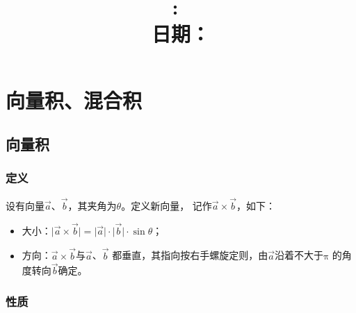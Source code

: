 \documentclass[12pt, a4paper]{article}
\title{
    \vspace{2in}
    \textmd{\textbf{\hmwkClass:\ \hmwkTitle}}\\
    \normalsize\vspace{0.1in}\small{日期： \hmwkDueDate}\\
    \vspace{0.1in}\large{\textit{\myUniversiy}}
    \vspace{3in}
}
\author{\hmwkAuthorName}
\date{}
\numberwithin{equation}{section}
\begin{document}
\maketitle

\pagebreak


\tableofcontents

\pagebreak


\pagebreak

\section{向量积、混合积}

\subsection{向量积}

\subsubsection{定义}

    设有向量\(\overrightarrow{a}\)、\(\overrightarrow{b}\)，其夹角为\(\theta\)。定义新向量，
    记作\(\overrightarrow{a} \times \overrightarrow{b}\)，如下：

    \begin{itemize}
        \item 大小：\(\lvert \overrightarrow{a} \times \overrightarrow{b} \rvert =
            \lvert \overrightarrow{a} \rvert \cdot \lvert \overrightarrow{b} \rvert \cdot \sin\theta\)；
        \item 方向：\(\overrightarrow{a} \times \overrightarrow{b}\)与\(\overrightarrow{a}\)、\(\overrightarrow{b}\)
            都垂直，其指向按右手螺旋定则，由\(\overrightarrow{a}\)沿着不大于\(\mathrm{\pi}\)
            的角度转向\(\overrightarrow{b}\)确定。
    \end{itemize}

\subsubsection{性质}
\end{document}
